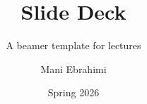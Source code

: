 
\title{Slide Deck}
\subtitle{A beamer template for lectures}
\author{Mani Ebrahimi}
\date{Spring 2026}

\def\deckLogo{images/logo.png}
